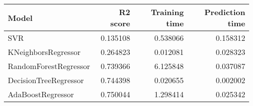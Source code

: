 \begin{tabular}{lrrr}
\toprule
Model & R2 score & Training time & Prediction time \\
\midrule
SVR & 0.135108 & 0.538066 & 0.158312 \\
KNeighborsRegressor & 0.264823 & 0.012081 & 0.028323 \\
RandomForestRegressor & 0.739366 & 6.125848 & 0.037087 \\
DecisionTreeRegressor & 0.744398 & 0.020655 & 0.002002 \\
AdaBoostRegressor & 0.750044 & 1.298414 & 0.025342 \\
\bottomrule
\end{tabular}
